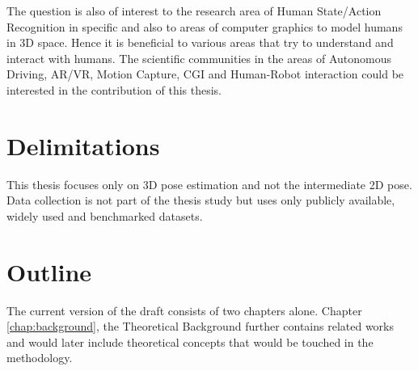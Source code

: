 The question is also of interest to the research area of Human State/Action Recognition in specific and also to areas of computer graphics to model humans in 3D space. Hence it is beneficial to various areas that try to understand and interact with humans. The scientific communities in the areas of Autonomous Driving, AR/VR, Motion Capture, CGI and Human-Robot interaction could be interested in the contribution of this thesis.

\section{Delimitations}
This thesis focuses only on 3D pose estimation and not the intermediate 2D pose. Data collection is not part of the thesis study but uses only publicly available, widely used and benchmarked datasets. 

\section{Outline}
The current version of the draft consists of two chapters alone. Chapter \ref{chap:background}, the Theoretical Background further contains related works and would later include theoretical concepts that would be touched in the methodology.
